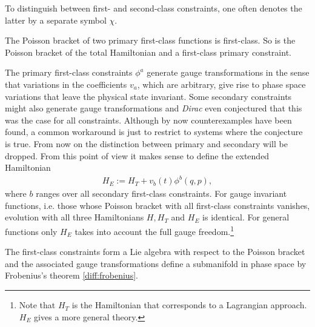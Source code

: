     \begin{notation}
        To distinguish between first- and second-class constraints, one often denotes the latter by a separate symbol $\chi$.
    \end{notation}
    \begin{property}
        The Poisson bracket of two primary first-class functions is first-class. So is the Poisson bracket of the total Hamiltonian and a first-class primary constraint.
    \end{property}

    \begin{remark}
        The primary first-class constraints $\phi^a$ generate gauge transformations in the sense that variations in the coefficients $v_a$, which are arbitrary, give rise to phase space variations that leave the physical state invariant. Some secondary constraints might also generate gauge transformations and \textit{Dirac} even conjectured that this was the case for all constraints. Although by now counterexamples have been found, a common workaround is just to restrict to systems where the conjecture is true. From now on the distinction between primary and secondary will be dropped. From this point of view it makes sense to define the extended Hamiltonian
        \begin{gather}
            H_E := H_T + v_b(t)\phi^b(q,p),
        \end{gather}
        where $b$ ranges over all secondary first-class constraints. For gauge invariant functions, i.e. those whose Poisson bracket with all first-class constraints vanishes, evolution with all three Hamiltonians $H,H_T$ and $H_E$ is identical. For general functions only $H_E$ takes into account the full gauge freedom.\footnote{Note that $H_T$ is the Hamiltonian that corresponds to a Lagrangian approach. $H_E$ gives a more general theory.}
    \end{remark}
    \begin{result}
        The first-class constraints form a Lie algebra with respect to the Poisson bracket and the associated gauge transformations define a submanifold in phase space by Frobenius's theorem \ref{diff:frobenius}.
    \end{result}

